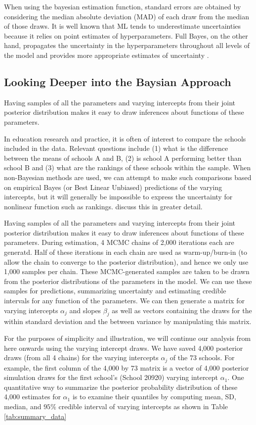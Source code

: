 When using the bayesian estimation function, standard errors are obtained by considering the median absolute deviation (MAD) of each draw from the median of those draws.  It is well known that ML tends to underestimate uncertainties because it relies on point estimates of hyperparameters. Full Bayes, on the other hand, propagates the uncertainty in the hyperparameters throughout all levels of the model and provides more appropriate estimates of uncertainty \cite{browne2006comparison}.

\subsection{Looking Deeper into the Baysian Approach}
\label{section:Deeper}
Having samples of all the parameters and varying intercepts from their joint posterior distribution makes it easy to draw inferences about functions of these parameters. 

In education research and practice, it is often of interest to compare the schools included in the data. Relevant questions include (1) what is the difference between the means of schools A and B, (2) is school A performing better than school B and (3) what are the rankings of these schools within the sample. When non-Bayesian methods are used, we can attempt to make such comparisons based on empirical Bayes (or Best Linear Unbiased) predictions of the varying intercepts, but it will generally be impossible to express the uncertainty for nonlinear function such as rankings. \cite{goldstein1996league} discuss this in greater detail.

Having samples of all the parameters and varying intercepts from their joint posterior distribution makes it easy to draw inferences about functions of these parameters. 
During estimation, 4 MCMC chains of 2,000 iterations each are generatd. Half of these iterations in each chain are used as warm-up/burn-in (to allow the chain to converge to the posterior distribution), and hence we only use 1,000 samples per chain. These MCMC-generated samples are taken to be drawn from the posterior distributions of the parameters in the model. We can use these samples for predictions, summarizing uncertainty and estimating credible intervals for any function of the parameters. 
We can then generate a matrix for varying intercepts $\alpha_j$ and slopes $\beta_j$ as well as vectors containing the draws for the within standard deviation and the between variance by manipulating this matrix. 

For the purposes of simplicity and illustration, we will continue our analysis from here onwards using the varying intercept draws. We have saved 4,000 posterior draws (from all 4 chains) for the varying intercepts $\alpha_{j}$ of the 73 schools. For example, the first column of the 4,000 by 73 matrix is a vector of 4,000 posterior simulation draws for the first school's (School 20920) varying intercept $\alpha_{1}$.  One quantitative way to summarize the posterior probability distribution of these 4,000 estimates for $\alpha_{1}$ is to examine their quantiles by computing mean, SD, median, and $95\%$ credible interval of varying intercepts as shown in Table \ref{tab:summary_data}

